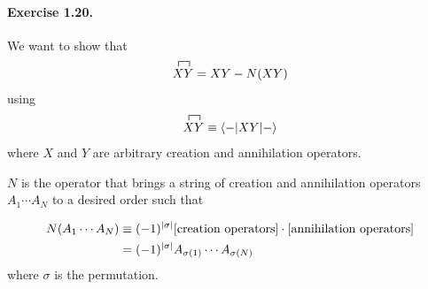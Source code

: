 \documentclass[12pt]{article}
\title{}
\newcommand{\la}{\langle}
\newcommand{\ra}{\rangle}
\DeclarePairedDelimiter\abs{\lvert}{\rvert}%
\newcommand{\eq}[1]{{\begin{align*}#1\end{align*}}}
\begin{document}
\paragraph{Exercise 1.20.}
\label{par:ex1.20}
\begin{itshape}
We want to show that
\eq{
\contraction{}{X}{}{Y}
XY
= XY-N(XY)
}
using
\eq{
\contraction{}{X}{}{Y}
XY
\equiv \la - | XY | - \ra
}
where $X$ and $Y$ are arbitrary creation and annihilation operators.

$N$ is the operator that brings a string of creation and annihilation operators
$A_1\cdots A_N$ to a desired order such that

\begin{align}
N(A_1\cdots A_N) &\equiv  (-1)^{\abs{\sigma}}[\text{creation operators}]
    \cdot[\text{annihilation operators}] \nonumber\\
    &=(-1)^{\abs{\sigma}}A_{\sigma(1)}\cdots A_{\sigma(N)}\label{eq:1.20.1}
\end{align}
where $\sigma$ is the permutation.
\end{itshape}
\\
\end{document}
